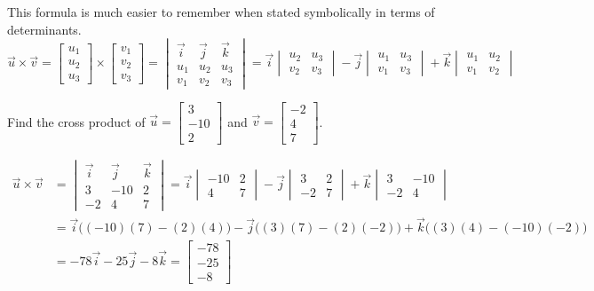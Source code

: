 \documentclass{ximera}
\begin{document}
This formula is much easier to remember when stated symbolically in terms of determinants.
$$\vec{u}\times \vec{v}=\begin{bmatrix}u_1\\u_2\\u_3\end{bmatrix}\times\begin{bmatrix}v_1\\v_2\\v_3\end{bmatrix}=\begin{vmatrix}\vec{i}&\vec{j}&\vec{k}\\u_1&u_2&u_3\\v_1&v_2&v_3\end{vmatrix}=\vec{i}\begin{vmatrix}u_2&u_3\\v_2&v_3\end{vmatrix}-\vec{j}\begin{vmatrix}u_1&u_3\\v_1&v_3\end{vmatrix}+\vec{k}\begin{vmatrix}u_1&u_2\\v_1&v_2\end{vmatrix} $$

\begin{example}\label{ex:crossproduct}
Find the cross product of $\vec{u}=\begin{bmatrix}3\\ -10\\ 2\end{bmatrix}$ and $\vec{v}=\begin{bmatrix}-2\\ 4\\ 7\end{bmatrix}$.
\begin{explanation}
\begin{align*}
\vec{u}\times \vec{v}&=
\begin{vmatrix}
\vec{i} & \vec{j} & \vec{k}\\
3 & -10 &2\\
-2 &4 &7
\end{vmatrix} =\vec{i}
\begin{vmatrix}
-10 & 2\\
4 & 7
\end{vmatrix} -\vec{j}
\begin{vmatrix}
3 & 2\\
-2 & 7
\end{vmatrix} +\vec{k}
\begin{vmatrix}
3 & -10\\
-2 & 4
\end{vmatrix}\\
&=\vec{i}\Big((-10)(7)-(2)(4)\Big)-\vec{j}\Big((3)(7)-(2)(-2)\Big)+\vec{k}\Big((3)(4)-(-10)(-2)\Big)\\
&=-78\vec{i}-25\vec{j}-8\vec{k}
=\begin{bmatrix}-78\\ -25\\ -8\end{bmatrix}
\end{align*}
\end{explanation}
\end{example}
\end{document}
